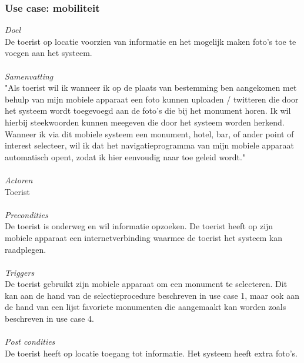 \documentclass[a4paper,10pt]{article}
\begin{document}
			\subsubsection{Use case: mobiliteit}
			\textit{Doel}\\
			De toerist op locatie voorzien van informatie en het mogelijk maken foto's toe te voegen aan het systeem.\\ \\
			\textit{Samenvatting}\\
			"Als toerist wil ik wanneer ik op de plaats van bestemming ben aangekomen met behulp van mijn mobiele apparaat een foto kunnen uploaden / twitteren die door het systeem wordt toegevoegd aan de foto's die bij het monument horen. Ik wil hierbij steekwoorden kunnen meegeven die door het systeem worden herkend. Wanneer ik via dit mobiele systeem een monument, hotel, bar, of ander point of interest selecteer, wil ik dat het navigatieprogramma van mijn mobiele apparaat automatisch opent, zodat ik hier eenvoudig naar toe geleid wordt."\\ \\
			\textit{Actoren}\\
			Toerist\\ \\
			\textit{Precondities}\\
			De toerist is onderweg en wil informatie opzoeken. De toerist heeft op zijn mobiele apparaat een internetverbinding waarmee de toerist het systeem kan raadplegen.\\ \\
			\textit{Triggers}\\
			De toerist gebruikt zijn mobiele apparaat om een monument te selecteren. Dit kan aan de hand van de selectieprocedure beschreven in use case 1, maar ook aan de hand van een lijst favoriete monumenten die aangemaakt kan worden zoals beschreven in use case 4.\\ \\
			\textit{Post condities}\\
			De toerist heeft op locatie toegang tot informatie. Het systeem heeft extra foto's.	
			
\end{document}
